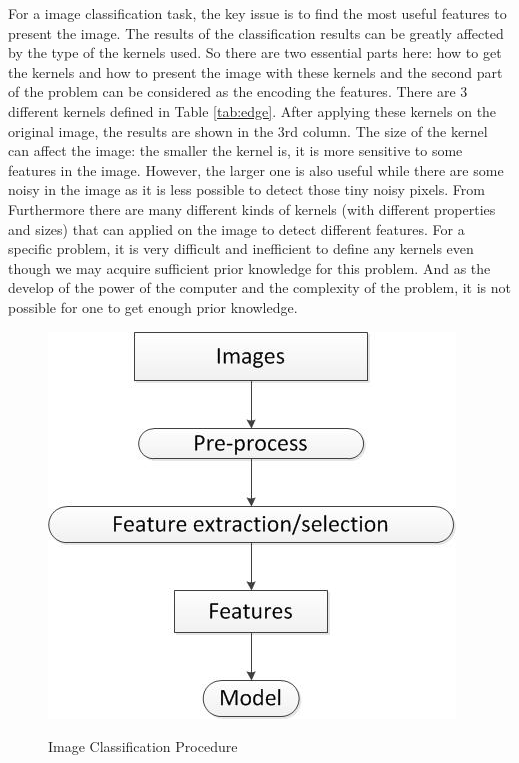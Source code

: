 For a image classification task, the key issue is to find the most useful features to present the image. The results of the classification results can be greatly affected by the type of the kernels used. So there are two essential parts here: how to get the kernels and how to present the image with these kernels and the second part of the problem can be considered as the encoding the features. There are 3 different kernels defined in Table \ref{tab:edge}. After applying these kernels on the original image, the results are shown in the 3rd column. The size of the kernel can affect the image: the smaller the kernel is, it is more sensitive to some features in the image. However, the larger one is also useful while there are some noisy in the image as it is less possible to detect those tiny noisy pixels. From Furthermore there are many different kinds of kernels (with different properties and sizes) that can applied on the image to detect different features. For a specific problem, it is very difficult and inefficient to define any kernels even though we may acquire sufficient prior knowledge for this problem. And as the develop of the power of the computer and the complexity of the problem, it is not possible for one to get enough prior knowledge.
 \begin{figure}
  \centering
  \includegraphics[scale=0.6]{fig/proces.jpg}\\
  \caption{Image Classification Procedure}
\end{figure}


